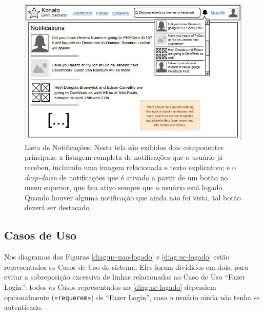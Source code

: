 \documentclass[12pt,a4paper,twoside,hyphens,english,brazil]{abntex2}
\begin{document}
{\begin{figure}[h]
\centering
	\includegraphics[width=1\linewidth]{imagens/prototipos/1-6-3_Notifications.jpg}
	\caption[Lista de Notificações]{Lista de Notificações. Nesta tela são exibidos dois componentes principais: a listagem completa de notificações que o usuário já recebeu, incluindo uma imagem relacionada e texto explicativo; e o \emph{drop-down} de notificações que é ativado a partir de um botão no menu superior, que fica ativo sempre que o usuário está logado. Quando houver alguma notificação que ainda não foi vista, tal botão deverá ser destacado.}
	\label{prot:list-notifications}
\end{figure}


\FloatBarrier
\subsection{Casos de Uso} \label{sec:ucs}
\newcommand\pad[1] {\expandafter\realpad\csname c@#1\endcsname}
\newcommand\realpad[1] {%
	\ifnum #1<10 0\fi%
	\number#1%
}
\renewcommand{\theUC} {[UC-\pad{UC}]}
\DeclareRobustCommand{\UC} {%
	\refstepcounter{UC}%
	\theUC%
}

Nos diagramas das Figuras \ref{diag:uc-nao-logado} e \ref{diag:uc-logado} estão representados os Casos de Uso do sistema. Eles foram divididos em dois, para evitar a sobreposição excessiva de linhas relacionadas ao Caso de Uso ``Fazer Login'': todos os Casos representados na \autoref{diag:uc-logado} dependem opcionalmente (\texttt{«requerem»}) de ``Fazer Login'', caso o usuário ainda não tenha se autenticado.

}
\end{document}

